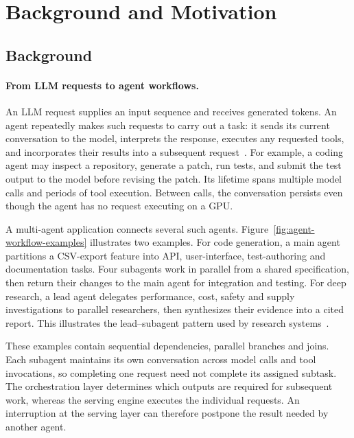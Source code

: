 \section{Background and Motivation}
\label{sec:background-motivation}

\subsection{Background}
\label{sec:motivation-background}

\paragraph{From LLM requests to agent workflows.}
An LLM request supplies an input sequence and receives generated tokens.
An agent repeatedly makes such requests to carry out a task: it sends
its current conversation to the model, interprets the response, executes
any requested tools, and incorporates their results into a subsequent
request~\cite{wu2023autogen}. For example, a coding agent may inspect a
repository, generate a patch, run tests, and submit the test output to
the model before revising the patch. Its lifetime spans multiple model
calls and periods of tool execution. Between calls, the conversation
persists even though the agent has no request executing on a GPU.

A multi-agent application connects several such agents.
Figure~\ref{fig:agent-workflow-examples} illustrates two examples.
For code generation, a main agent partitions a CSV-export feature into
API, user-interface, test-authoring and documentation tasks. Four
subagents work in parallel from a shared specification, then return
their changes to the main agent for integration and testing.
For deep research, a lead agent delegates performance, cost, safety
and supply investigations to parallel researchers, then synthesizes
their evidence into a cited report. This illustrates the lead--subagent
pattern used by research systems~\cite{anthropic2025multiagent}.

These examples contain sequential dependencies, parallel branches and
joins. Each subagent maintains its own conversation across model calls
and tool invocations, so completing one request need not complete its
assigned subtask. The orchestration layer determines which outputs are
required for subsequent work, whereas the serving engine executes the
individual requests. An interruption at the serving layer can therefore
postpone the result needed by another agent.

